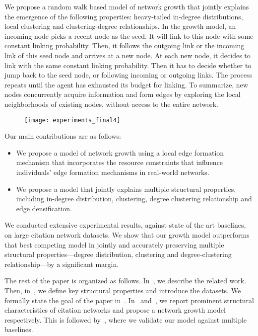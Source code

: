 We propose a random walk based model of network growth that jointly explains the
emergence of the following properties: heavy-tailed in-degree distributions,
local clustering and clustering-degree relationships. In the growth model, an
incoming node picks a recent node as the seed. It will link to this node with
some constant linking probability. Then, it follows the outgoing link or the
incoming link of this seed node and arrives at a new node. At each new node, it
decides to link with the same constant linking probability. Then it has to
decide whether to jump back to the seed node, or following incoming or outgoing
links. The process repeats until the agent has exhausted its budget for linking.
To summarize, new nodes concurrently acquire information and form edges
by exploring the local neighborhoods of existing nodes, without access to the
entire network.

\begin{figure}[t]
 \centering
 \texttt{[image: experiments\_final4]}
 \caption{
 }
 \label{fig:intro_plot}
\end{figure}


Our main contributions are as follows:
\begin{itemize}
    \item We propose a model
    of network growth using a local edge formation mechanism that incorporates the
    resource constraints that influence individuals' edge formation mechanisms in
    real-world networks.
    \item We propose a model that jointly explains multiple
    structural properties, including in-degree distribution, clustering, degree
    clustering relationship and edge densification.
\end{itemize}


We conducted extensive experimental results, against state of the art
baselines, on large citation network datasets. We show that our growth model
outperforms that best competing model in jointly and accurately preserving
multiple structural properties---degree distribution, clustering and
degree-clustering relationship---by a significant margin.

The rest of the paper is organized as follows. In~, we
describe the related work. Then, in~, we define key
structural properties and introduce the datasets. We formally state the goal of
the paper in~. In~
and~, we report prominent structural characteristics
of citation networks and propose a network growth model respectively. This is
followed by~, where we validate our model against
multiple baselines.